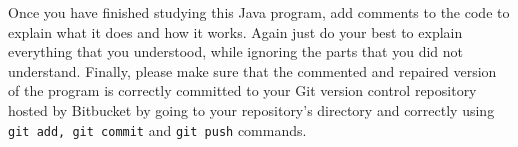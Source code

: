 Once you have finished studying this Java program, add comments to the code to explain what
it does and how it works. Again just do your best to explain everything that you understood, while ignoring the parts that you did not understand. Finally, please make sure that the commented and repaired version of the program is correctly committed to your Git version control repository hosted by Bitbucket by going to your repository's directory and correctly using {\tt git add, git commit} and {\tt git push} commands. 





    
